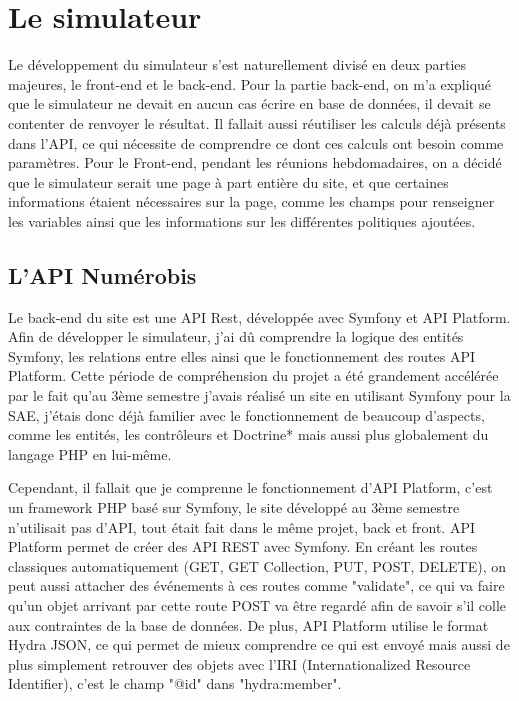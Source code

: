 \documentclass[a4paper,12pt]{report}
\begin{document}
\section{Le simulateur}
Le développement du simulateur s'est naturellement divisé en deux parties majeures, le front-end et le back-end. Pour la partie back-end, on m'a expliqué que le simulateur ne devait en aucun cas écrire en base de données, il devait se contenter de renvoyer le résultat. Il fallait aussi réutiliser les calculs déjà présents dans l'API, ce qui nécessite de comprendre ce dont ces calculs ont besoin comme paramètres. Pour le Front-end, pendant les réunions hebdomadaires, on a décidé que le simulateur serait une page à part entière du site, et que certaines informations étaient nécessaires sur la page, comme les champs pour renseigner les variables ainsi que les informations sur les différentes politiques ajoutées.

\subsection{L'API Numérobis}
Le back-end du site est une API Rest, développée avec Symfony et API Platform. Afin de développer le simulateur, j'ai dû comprendre la logique des entités Symfony, les relations entre elles ainsi que le fonctionnement des routes API Platform. Cette période de compréhension du projet a été grandement accélérée par le fait qu'au 3ème semestre j'avais réalisé un site en utilisant Symfony pour la SAE, j'étais donc déjà familier avec le fonctionnement de beaucoup d'aspects, comme les entités, les contrôleurs et Doctrine* mais aussi plus globalement du langage PHP en lui-même.

Cependant, il fallait que je comprenne le fonctionnement d'API Platform, c'est un framework PHP basé sur Symfony, le site développé au 3ème semestre n'utilisait pas d'API, tout était fait dans le même projet, back et front. API Platform permet de créer des API REST avec Symfony. En créant les routes classiques automatiquement (GET, GET Collection, PUT, POST, DELETE), on peut aussi attacher des événements à ces routes comme "validate", ce qui va faire qu'un objet arrivant par cette route POST va être regardé afin de savoir s'il colle aux contraintes de la base de données. De plus, API Platform utilise le format Hydra JSON, ce qui permet de mieux comprendre ce qui est envoyé mais aussi de plus simplement retrouver des objets avec l'IRI (Internationalized Resource Identifier), c'est le champ "@id" dans "hydra:member".
\end{document}

